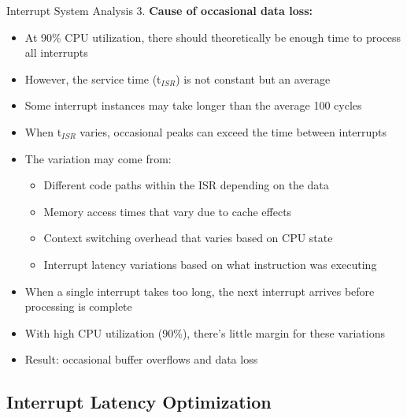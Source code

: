 \begin{example2}{Interrupt System Analysis}
3. \textbf{Cause of occasional data loss:}
   \begin{itemize}
     \item At 90\% CPU utilization, there should theoretically be enough time to process all interrupts
     \item However, the service time (t$_{ISR}$) is not constant but an average
     \item Some interrupt instances may take longer than the average 100 cycles
     \item When t$_{ISR}$ varies, occasional peaks can exceed the time between interrupts
     \item The variation may come from:
     \begin{itemize}
       \item Different code paths within the ISR depending on the data
       \item Memory access times that vary due to cache effects
       \item Context switching overhead that varies based on CPU state
       \item Interrupt latency variations based on what instruction was executing
     \end{itemize}
     \item When a single interrupt takes too long, the next interrupt arrives before processing is complete
     \item With high CPU utilization (90\%), there's little margin for these variations
     \item Result: occasional buffer overflows and data loss
   \end{itemize}
\end{example2}

\subsection{Interrupt Latency Optimization}

